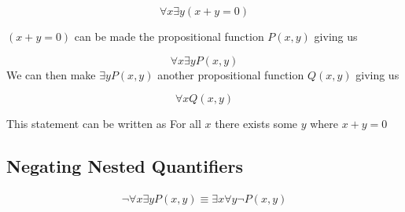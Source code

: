 \documentclass[12pt letter]{report}
\begin{document}

\[
	\forall x \exists y \left( x + y = 0 \right)
\]

$ \left( x + y = 0 \right)  $ can be made the propositional function $P \left( x, y \right) $ giving us

\[
	\forall x \exists y P \left( x, y \right)
\]
We can then make $\exists y P \left( x, y \right) $ another propositional function $Q \left( x, y \right) $ giving us

\[
	\forall x Q \left( x, y \right)
\]

This statement can be written as For all $x$ there exists some $y$ where $x + y = 0$


\subsection{Negating Nested Quantifiers}

\begin{align*}
	\neg  \forall x \exists y P \left( x, y \right) \equiv \exists x \forall y \neg P \left( x, y \right) \tag*{
		By De Morgan's Law
	}
\end{align*}
\end{document}
